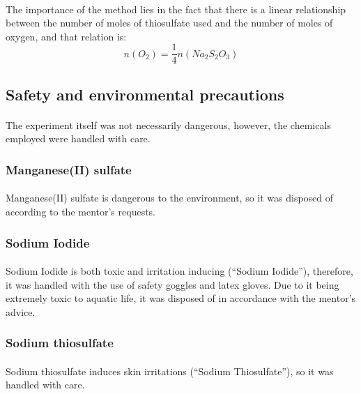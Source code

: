 \documentclass[a4paper]{article}
\begin{document}
\paragraph*{}
The importance of the method lies in the fact that there is a linear
relationship between the number of moles of thiosulfate used and the number of
moles of oxygen, and that relation is:
$$n(O_2) = \frac{1}{4} n(Na_2S_2O_3)$$

\subsection{Safety and environmental precautions}

\paragraph*{}
The experiment itself was not necessarily dangerous, however, the chemicals
employed were handled with care.

\subsubsection{Manganese(II) sulfate}

\paragraph*{}
Manganese(II) sulfate is dangerous to the environment, so it was disposed of
according to the mentor's requests.

\subsubsection{Sodium Iodide}

\paragraph*{}
Sodium Iodide is both toxic and irritation inducing (``Sodium Iodide''),
therefore, it was handled with the use of safety goggles and latex gloves. Due
to it being extremely toxic to aquatic life, it was disposed of in accordance
with the mentor's advice.

\subsubsection{Sodium thiosulfate}

\paragraph*{}
Sodium thiosulfate induces skin irritations (``Sodium Thiosulfate''), so it was
handled with care. 
\end{document}
